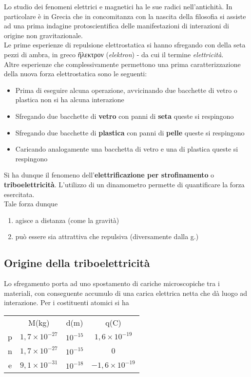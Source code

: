 Lo studio dei fenomeni elettrici e magnetici ha le sue radici nell'antichità. In particolare è in Grecia che in concomitanza con la nascita della filosofia si assiste ad una prima indagine protoscientifica delle manifestazioni di interazioni di origine non gravitazionale.
\\Le prime esperienze di repulsione elettrostatica si hanno sfregando con della seta pezzi di ambra, in greco ἤλεκτρον (\textit{elektron}) - da cui il termine \textit{elettricità}.
\\Altre esperienze che complessivamente permettono una prima caratterizzazione della nuova forza elettrostatica sono le seguenti:
\begin{itemize}
\item Prima di eseguire alcuna operazione, avvicinando due bacchette di vetro o plastica non si ha alcuna interazione
\item Sfregando due bacchette di \textbf{vetro} con panni di \textbf{seta} queste si respingono
\item Sfregando due bacchette di \textbf{plastica} con panni di \textbf{pelle} queste si respingono
\item Caricando analogamente una bacchetta di vetro e una di plastica queste si respingono
\end{itemize}
Si ha dunque il fenomeno dell'\textbf{elettrificazione per strofinamento} o \textbf{triboelettricità}. L'utilizzo di un dinamometro permette di quantificare la forza esercitata.
\\Tale forza dunque
\begin{enumerate}
\item agisce a distanza (come la gravità)
\item può essere sia attrattiva che repulsiva (diversamente dalla g.)
\end{enumerate}

\subsection{Origine della triboelettricità}
Lo sfregamento porta ad uno spostamento di cariche microscopiche tra i materiali, con conseguente accumulo di una carica elettrica netta che dà luogo ad interazione. Per i costituenti atomici si ha
\begin{table}[h!]
\centering
\begin{tabular}{c c c c}
& M(kg) & d(m) & q(C)\\
p & $1,7 \times 10^{-27}$ & $10^{-15}$ & $1,6 \times 10^{-19}$ \\
n & $1,7 \times 10^{-27}$ & $10^{-15}$ & $0$ \\
e & $9,1 \times 10^{-31}$ & $10^{-18}$ & $-1,6 \times 10^{-19}$
\end{tabular}
\end{table}

